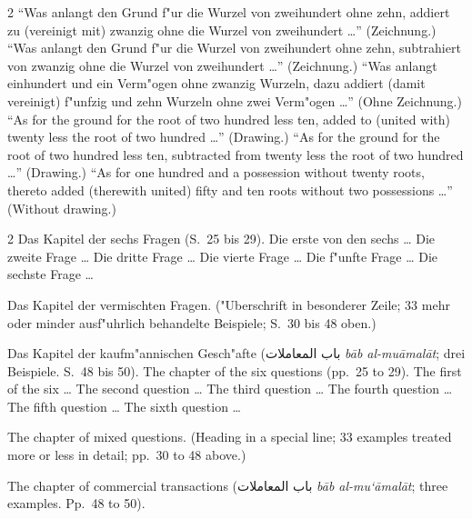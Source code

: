 \documentclass[10pt,a4paper]{article}
\renewcommand{\switchcolumn}{\syncronize\nointerlineskip\columnbreak}
\newcommand{\RL}[1]{\beginR#1\endR}
\newcommand{\ar}[1]{{\arabicfont\RL{#1}}}
\newcommand{\enquote}[1]{``#1''}
\begin{document}
\begin{paracol}{2}
\enquote{Was anlangt den Grund f"ur die Wurzel von zweihundert ohne zehn, addiert zu (vereinigt mit) zwanzig ohne die Wurzel von zweihundert \ldots{}} (Zeichnung.) \enquote{Was anlangt den Grund f"ur die Wurzel von zweihundert ohne zehn, subtrahiert von zwanzig ohne die Wurzel von zweihundert \ldots{}} (Zeichnung.) \enquote{Was anlangt einhundert und ein Verm"ogen ohne zwanzig Wurzeln, dazu addiert (damit vereinigt) f"unfzig und zehn Wurzeln ohne zwei Verm"ogen \ldots{}} (Ohne Zeichnung.)
\switchcolumn
``As for the ground for the root of two hundred less ten, added to (united with) twenty less the root of two hundred \ldots{}'' (Drawing.) ``As for the ground for the root of two hundred less ten, subtracted from twenty less the root of two hundred \ldots{}'' (Drawing.) ``As for one hundred and a possession without twenty roots, thereto added (therewith united) fifty and ten roots without two possessions \ldots{}'' (Without drawing.)
\end{paracol}

\begin{paracol}{2}
Das Kapitel der sechs Fragen (S.\ 25 bis 29). Die erste von den sechs \ldots{} Die zweite Frage \ldots{} Die dritte Frage \ldots{} Die vierte Frage \ldots{} Die f"unfte Frage \ldots{} Die sechste Frage \ldots{}

Das Kapitel der vermischten Fragen. ("Uberschrift in besonderer Zeile; 33 mehr oder minder ausf"uhrlich behandelte Beispiele; S.\ 30 bis 48 oben.)

Das Kapitel der kaufm"annischen Gesch"afte (\ar{باب المعاملات} \textit{b\=ab al-mu\=amal\=at}; drei Beispiele. S.\ 48 bis 50).
\switchcolumn
The chapter of the six questions (pp.\ 25 to 29). The first of the six \ldots{} The second question \ldots{} The third question \ldots{} The fourth question \ldots{} The fifth question \ldots{} The sixth question \ldots{}

The chapter of mixed questions. (Heading in a special line; 33 examples treated more or less in detail; pp.\ 30 to 48 above.)

The chapter of commercial transactions (\ar{باب المعاملات} \textit{b\=ab al-mu`\=amal\=at}; three examples. Pp.\ 48 to 50).
\end{paracol}
\end{document}
